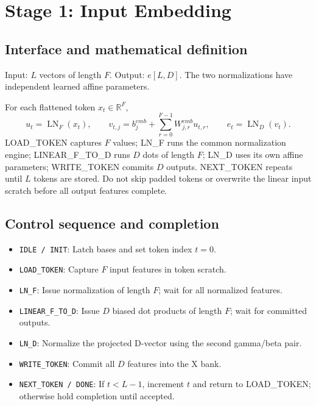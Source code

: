 \documentclass[11pt,a4paper]{article}
\begin{document}
\section{Stage 1: Input Embedding}
\subsection{Interface and mathematical definition}
Input: $L$ vectors of length $F$. Output: $e[L,D]$. The two normalizations have independent learned affine parameters.

For each flattened token $x_t\in\mathbb{R}^{F}$,
\[
u_t=\operatorname{LN}_{F}(x_t),\qquad
v_{t,j}=b^{emb}_j+\sum_{r=0}^{F-1}W^{emb}_{j,r}u_{t,r},\qquad
e_t=\operatorname{LN}_{D}(v_t).
\]
LOAD\_TOKEN captures $F$ values; LN\_F runs the common normalization engine; LINEAR\_F\_TO\_D runs $D$ dots of length $F$; LN\_D uses its own affine parameters; WRITE\_TOKEN commits $D$ outputs. NEXT\_TOKEN repeats until $L$ tokens are stored. Do not skip padded tokens or overwrite the linear input scratch before all output features complete.

\subsection{Control sequence and completion}
\begin{itemize}
\item \texttt{IDLE / INIT}: Latch bases and set token index $t=0$.
\item \texttt{LOAD\_TOKEN}: Capture $F$ input features in token scratch.
\item \texttt{LN\_F}: Issue normalization of length $F$; wait for all normalized features.
\item \texttt{LINEAR\_F\_TO\_D}: Issue $D$ biased dot products of length $F$; wait for committed outputs.
\item \texttt{LN\_D}: Normalize the projected D-vector using the second gamma/beta pair.
\item \texttt{WRITE\_TOKEN}: Commit all $D$ features into the X bank.
\item \texttt{NEXT\_TOKEN / DONE}: If $t<L-1$, increment $t$ and return to LOAD_TOKEN; otherwise hold completion until accepted.
\end{itemize}
\end{document}
